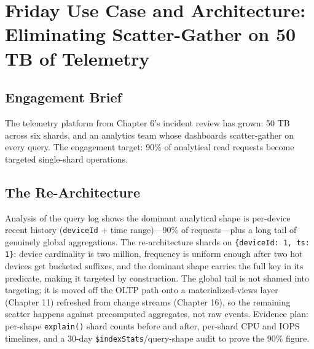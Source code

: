 \section{Friday Use Case and Architecture: Eliminating Scatter-Gather on 50 TB of Telemetry}
\subsection{Engagement Brief}
The telemetry platform from Chapter 6's incident review has grown: 50 TB across six shards, and an analytics team whose dashboards scatter-gather on every query. The engagement target: 90\% of analytical read requests become targeted single-shard operations.

\subsection{The Re-Architecture}
Analysis of the query log shows the dominant analytical shape is per-device recent history (\texttt{deviceId} + time range)---90\% of requests---plus a long tail of genuinely global aggregations. The re-architecture shards on \texttt{\{deviceId: 1, ts: 1\}}: device cardinality is two million, frequency is uniform enough after two hot devices get bucketed suffixes, and the dominant shape carries the full key in its predicate, making it targeted by construction. The global tail is not shamed into targeting; it is moved off the OLTP path onto a materialized-views layer (Chapter 11) refreshed from change streams (Chapter 16), so the remaining scatter happens against precomputed aggregates, not raw events. Evidence plan: per-shape \texttt{explain()} shard counts before and after, per-shard CPU and IOPS timelines, and a 30-day \texttt{\$indexStats}/query-shape audit to prove the 90\% figure.

